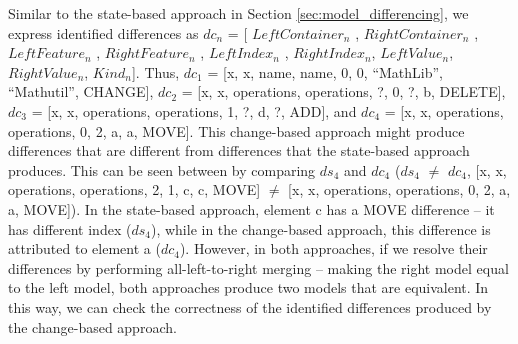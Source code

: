 Similar to the state-based approach in Section \ref{sec:model_differencing}, we express identified differences as $dc_{n}$ = [ $LeftContainer_n$ , $RightContainer_n$ , $LeftFeature_n$ , $RightFeature_n$ , $LeftIndex_n$ , $RightIndex_n$, $LeftValue_n$, $RightValue_n$, $Kind_n$]. Thus, $dc_{1}$ =  [\textsf{x}, \textsf{x}, \textsf{name}, \textsf{name}, 0, 0, ``MathLib'', ``Mathutil'', \textsf{CHANGE}], $dc_{2}$ = [\textsf{x}, \textsf{x}, \textsf{operations}, \textsf{operations}, ?, 0, ?, \textsf{b}, \textsf{DELETE}], $dc_{3}$ = [\textsf{x}, \textsf{x}, \textsf{operations}, \textsf{operations}, 1, ?, \textsf{d}, ?, \textsf{ADD}], and $dc_{4}$ = [\textsf{x}, \textsf{x}, \textsf{operations}, \textsf{operations}, 0, 2, \textsf{a}, \textsf{a}, \textsf{MOVE}]. This change-based approach might produce differences that are different from differences that the state-based approach produces. This can be seen between by comparing $ds_{4}$ and $dc_{4}$ ($ds_{4}$ $\neq$ $dc_{4}$, [\textsf{x}, \textsf{x}, \textsf{operations}, \textsf{operations}, 2, 1, \textsf{c}, \textsf{c}, \textsf{MOVE}] $\neq$ [\textsf{x}, \textsf{x}, \textsf{operations}, \textsf{operations}, 0, 2, \textsf{a}, \textsf{a}, \textsf{MOVE}]). In the state-based approach, element \textsf{c} has a \textsf{MOVE} difference -- it has different index ($ds_{4}$), while in the change-based approach, this difference is attributed to element \textsf{a} ($dc_{4}$). However, in both approaches, if we resolve their differences by performing all-left-to-right merging  -- making the right model equal to the left model, both approaches produce two models that are equivalent. In this way, we can check the correctness of the identified differences produced by the change-based approach.

